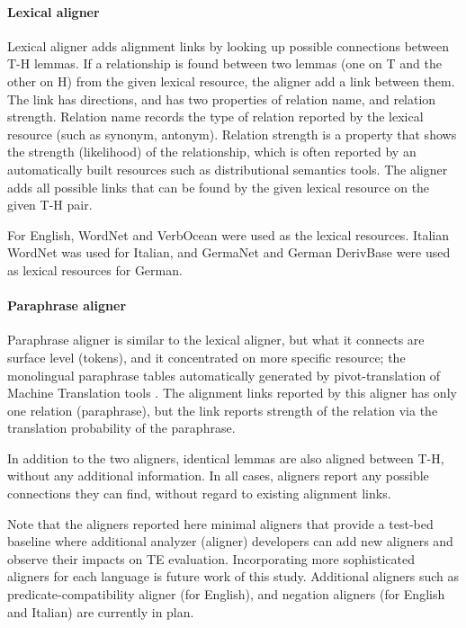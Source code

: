 \documentclass[11pt,letterpaper]{article}
\begin{document}
\paragraph{Lexical aligner} Lexical aligner adds alignment links by
looking up possible connections between T-H lemmas. If a relationship
is found between two lemmas (one on T and the other on H) from the
given lexical resource, the aligner add a link between them. The link
has directions, and has two properties of relation name, and relation  
strength. Relation name records the type of relation reported by the
lexical resource (such as synonym, antonym). Relation strength is a 
property that shows the strength (likelihood) of the relationship,
which is often reported by an automatically built resources such as
distributional semantics tools. The aligner adds all possible links  
that can be found by the given lexical resource on the given T-H
pair. 

For English, WordNet and VerbOcean were used as the lexical
resources. Italian WordNet \cite{} was used for Italian, and GermaNet
and German DerivBase \cite{} were used as lexical resources for
German.

\paragraph{Paraphrase aligner} Paraphrase aligner is similar to the
lexical aligner, but what it connects are surface level (tokens),
and it concentrated on more specific resource; the monolingual
paraphrase tables automatically generated by pivot-translation of
Machine Translation tools \cite{}. The alignment links reported by
this aligner has only one relation (paraphrase), but the link reports
strength of the relation via the translation probability of the
paraphrase. 

In addition to the two aligners, identical lemmas are also aligned
between T-H, without any additional information. In all cases,
aligners report any possible connections they can find, without
regard to existing alignment links.  

Note that the aligners reported here minimal aligners that provide a
test-bed baseline where additional analyzer (aligner) developers can
add new aligners and observe their impacts on TE
evaluation. Incorporating more sophisticated aligners for each 
language is future work of this study. Additional aligners such as
predicate-compatibility aligner (for English), and negation aligners
(for English and Italian) are currently in plan. 
\end{document}
